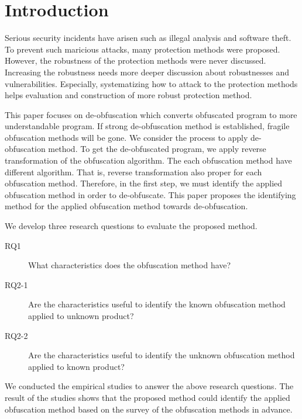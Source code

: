 \documentclass[conference]{IEEEtran}
\begin{document}

%
\IEEEpeerreviewmaketitle

\section{Introduction}\label{sect:introduction}

Serious security incidents have arisen such as illegal analysis and
software theft.  To prevent such maricious attacks, many protection
methods were proposed.  However, the robustness of the protection
methods were never discussed.  Increasing the robustness needs more
deeper discussion about robustnesses and vulnerabilities.  Especially,
systematizing how to attack to the protection methods helps evaluation
and construction of more robust protection method.

This paper focuses on de-obfuscation which converts obfuscated program
to more understandable program.  If strong de-obfuscation method is
established, fragile obfuscation methods will be gone.
%
We consider the process to apply de-obfuscation method.
%
To get the de-obfuscated program, we apply reverse transformation
of the obfuscation algorithm.  The each obfuscation method have
different algorithm.  That is, reverse transformation also proper for
each obfuscation method.  Therefore, in the first step, we must
identify the applied obfuscation method in order to de-obfuscate.
This paper proposes the identifying method for the applied obfuscation
method towards de-obfuscation.

We develop three research questions to evaluate the proposed method.
\begin{description}
\item[RQ1]   What characteristics does the obfuscation method have?
\item[RQ2-1] Are the characteristics useful to identify the known
  obfuscation method applied to unknown product?
\item[RQ2-2] Are the characteristics useful to identify the unknown
  obfuscation method applied to known product?
\end{description}
We conducted the empirical studies to answer the above research
questions.  The result of the studies shows that the proposed method
could identify the applied obfuscation method based on the survey of
the obfuscation methods in advance.
\end{document}
